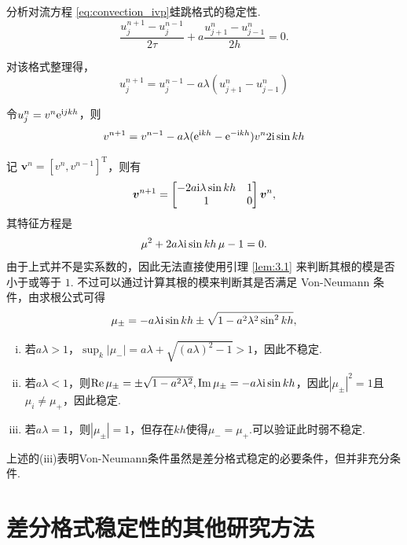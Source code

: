 \begin{instance}
    分析对流方程 \eqref{eq:convection_ivp}蛙跳格式的稳定性.
    \begin{equation*}
        \frac{u_j^{n+1} - u_j^{n-1}}{2\tau} + a \frac{u_{j+1}^n - u_{j-1}^n}{2h} = 0.
    \end{equation*}\par
    对该格式整理得，
    \[u_j^{n+1}=u_j^{n-1}-a\lambda(u_{j+1}^n-u_{j-1}^n)\]

    令$u_j^{n}=v^n\mathrm{e}^{\mathrm{i} jkh}$，则
    \[v^{n+1}=v^{n-1}-a\lambda(\mathrm{e}^{\mathrm{i} kh}-\mathrm{e}^{-\mathrm{i} kh})v^n 2\mathrm{i}\sin kh\]

    记 $\bm{v}^n = [v^n, v^{n-1}]^{\mathrm{T}}$，则有
    \begin{equation*}
        \bm{v}^{n+1} = \begin{bmatrix}
            -2a\mathrm{i}\lambda \sin kh & 1 \\
            1 & 0
        \end{bmatrix} \bm{v}^n,
    \end{equation*}
    其特征方程是
    \begin{equation*}
        \mu^2 + 2a\lambda\mathrm{i}\sin kh \, \mu - 1 = 0.
    \end{equation*}
    由于上式并不是实系数的，因此无法直接使用引理 \ref{lem:3.1} 来判断其根的模是否小于或等于 $1$. 不过可以通过计算其根的模来判断其是否满足 Von-Neumann 条件，由求根公式可得
    \begin{equation*}
        \mu_{\pm} = -a\lambda\mathrm{i}\sin kh \pm \sqrt{1 - a^2\lambda^2 \sin^2 kh},
    \end{equation*}
    \begin{enumerate}[(i)]
        \item 若$a\lambda>1$，$\sup_k{|\mu_{-}|}=a\lambda+\sqrt{(a\lambda)^2-1}>1$，因此不稳定.
        \item 若$a\lambda<1$，则$\mathrm{Re}\,\mu_{\pm}=\pm\sqrt{1-a^2\lambda^2},\mathrm{Im}\,\mu_\pm=-a\lambda\mathrm{i}\sin kh$，因此$|\mu_{\pm}|^2=1$且$\mu_{i}\neq \mu_{+}$，因此稳定.
        \item 若$a\lambda=1$，则$|\mu_{\pm}|=1$，但存在$kh$使得$\mu_{-}=\mu_{+}$.可以验证此时弱不稳定.
    \end{enumerate}
    上述的(iii)表明Von-Neumann条件虽然是差分格式稳定的必要条件，但并非充分条件.
\end{instance}

\section{差分格式稳定性的其他研究方法}

